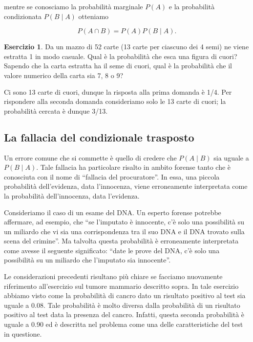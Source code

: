 \documentclass[
  11pt,
]{krantz}
\theoremstyle{definition}
\theoremstyle{definition}
\theoremstyle{definition}
\newtheorem{exercise}{Esercizio}[chapter]
\theoremstyle{definition}
\theoremstyle{remark}
\begin{document}
mentre se conosciamo la probabilità marginale \(P(A)\) e la probabilità condizionata \(P(B \mid A)\) otteniamo

\[
P(A \cap B) = P(A)P(B \mid A).
\]

\begin{exercise}
Da un mazzo di 52 carte (13 carte per ciascuno dei 4 semi) ne viene estratta 1 in modo casuale. Qual è la probabilità che esca una figura di cuori? Sapendo che la carta estratta ha il seme di cuori, qual è la probabilità che il valore numerico della carta sia 7, 8 o 9?

Ci sono 13 carte di cuori, dunque la risposta alla prima domanda è 1/4. Per rispondere alla seconda domanda consideriamo solo le 13 carte di cuori; la probabilità cercata è dunque 3/13.
\end{exercise}

\hypertarget{la-fallacia-del-condizionale-trasposto}{%
\subsection{La fallacia del condizionale trasposto}\label{la-fallacia-del-condizionale-trasposto}}

Un errore comune che si commette è quello di credere che \(P(A \mid B)\) sia uguale a \(P(B \mid A)\). Tale fallacia ha particolare risalto in ambito forense tanto che è conosciuta con il nome di ``fallacia del procuratore''. In essa, una piccola probabilità dell'evidenza, data l'innocenza, viene erroneamente interpretata come la probabilità dell'innocenza, data l'evidenza.

Consideriamo il caso di un esame del DNA. Un esperto forense potrebbe affermare, ad esempio, che ``se l'imputato è innocente, c'è solo una possibilità su un miliardo che vi sia una corrispondenza tra il suo DNA e il DNA trovato sulla scena del crimine''. Ma talvolta questa probabilità è erroneamente interpretata come avesse il seguente significato: ``date le prove del DNA, c'è solo una possibilità su un miliardo che l'imputato sia innocente''.

Le considerazioni precedenti risultano più chiare se facciamo nuovamente riferimento all'esercizio sul tumore mammario descritto sopra. In tale esercizio abbiamo visto come la probabilità di cancro dato un risultato positivo al test sia uguale a 0.08. Tale probabilità è molto diversa dalla probabilità di un risultato positivo al test data la presenza del cancro. Infatti, questa seconda probabilità è uguale a 0.90 ed è descritta nel problema come una delle caratteristiche del test in questione.
\end{document}
